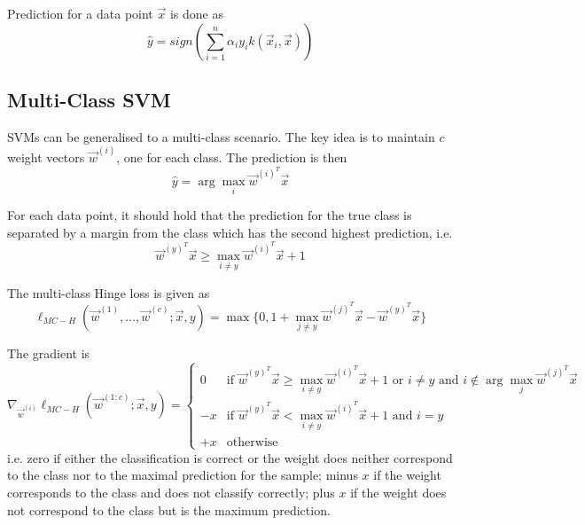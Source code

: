 Prediction for a data point $\vec{x}$ is done as
\begin{equation*}
\hat{y} = sign\left(
\sum_{i=1}^n{\alpha_i y_i k(\vec{x}_i, \vec{x})}
\right)
\end{equation*}


\subsection{Multi-Class SVM}
SVMs can be generalised to a multi-class scenario.
The key idea is to maintain $c$ weight vectors
$\vec{w}^{(i)}$, one for each class.
The prediction is then
\begin{equation*}
\hat{y} = \arg\max_i{\vec{w}^{(i)^T} \vec{x}}
\end{equation*}

For each data point, it should hold that the prediction
for the true class is separated by a margin from the
class which has the second highest prediction, i.e.
\begin{equation*}
\vec{w}^{(y)^T} \vec{x} \geq
\max_{i \neq y}{\vec{w}^{(i)^T}\vec{x}} + 1
\end{equation*}

The multi-class Hinge loss is given as
\begin{equation*}
\ell_{MC-H}(\vec{w}^{(1)}, \dotsc, \vec{w}^{(c)}; \vec{x}, y)
= \max{\{0, 1 +
	\max_{j \neq y}
	{\vec{w}^{(j)^T}\vec{x} - \vec{w}^{(y)^T}\vec{x}}
	\}}
\end{equation*}

The gradient is
\begin{equation*}
\nabla_{\vec{w}^{(i)}} \ell_{MC-H}(\vec{w}^{(1:c)}; \vec{x}, y) =
\begin{cases}
0 & \text{if $\vec{w}^{(y)^T} \vec{x} \geq \max_{i \neq y}{\vec{w}^{(i)^T}\vec{x}} + 1$ or $i \neq y$ and $i \notin \arg\max_j{\vec{w}^{(j)^T} \vec{x}}$} \\
-x & \text{if $\vec{w}^{(y)^T} \vec{x} < \max_{i \neq y}{\vec{w}^{(i)^T}\vec{x}} + 1$ and $i = y$} \\
+x & \text{otherwise}
\end{cases}
\end{equation*}
i.e. zero if either the classification is correct or the
weight does neither correspond to the class nor to the
maximal prediction for the sample;
minus $x$ if the weight corresponds to the class and does
not classify correctly;
plus $x$ if the weight does not correspond to the class
but is the maximum prediction.
